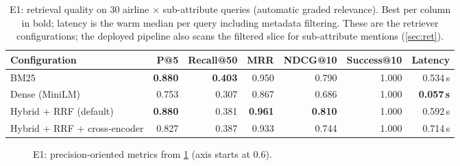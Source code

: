 \documentclass[10pt,twocolumn,a4paper]{article}
\newcommand{\best}[1]{\textbf{#1}}
\begin{document}
\begin{table}[t]
\centering\small
\caption{E1: retrieval quality on 30 airline $\times$ sub-attribute queries (automatic graded relevance). Best per column
in bold; latency is the warm median per query including metadata filtering. These are the retriever configurations; the
deployed pipeline also scans the filtered slice for sub-attribute mentions (\cref{sec:ret}).}
\label{tab:retrieval}
\begin{tabular}{@{}lrrrrrr@{}}
\toprule
\textbf{Configuration} & \textbf{P@5} & \textbf{Recall@50} & \textbf{MRR} & \textbf{NDCG@10} & \textbf{Success@10} & \textbf{Latency} \\
\midrule
BM25 & \best{0.880} & \best{0.403} & 0.950 & 0.790 & 1.000 & 0.534\,s \\
Dense (MiniLM) & 0.753 & 0.307 & 0.867 & 0.686 & 1.000 & \best{0.057\,s} \\
\rowcolor{shade} Hybrid + RRF (default) & \best{0.880} & 0.381 & \best{0.961} & \best{0.810} & 1.000 & 0.592\,s \\
Hybrid + RRF + cross-encoder & 0.827 & 0.387 & 0.933 & 0.744 & 1.000 & 0.714\,s \\
\bottomrule
\end{tabular}
\end{table}

\begin{figure}[t]
\centering
{}
\caption{E1: precision-oriented metrics from \cref{tab:retrieval} (axis starts at 0.6).}
\label{fig:retrieval}
\end{figure}
\end{document}
